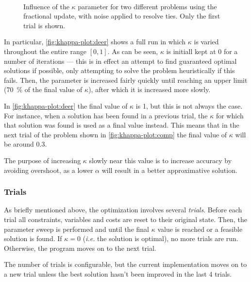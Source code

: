 \begin{figure}[p]
	\centering
	\\
	\caption{Influence of the \(\kappa\) parameter for two different problems using the fractional update, with noise applied to resolve ties. Only the first trial is shown.}
	\label{fig:khappa-plot}
\end{figure}

In particular, \cref{fig:khappa-plot:deer} shows a full run in which \(\kappa\) is varied throughout the entire range \([0,1]\).
As can be seen, \(\kappa\) is initiall kept at 0 for a number of iterations --- this is in effect an attempt to find guaranteed optimal solutions if possible, only attempting to solve the problem heuristically if this fails.
Then, the parameter is increased fairly quickly until reaching an upper limit (\SI{70}{\percent} of the final value of \(\kappa\)), after which it is increased more slowly.

In \cref{fig:khappa-plot:deer} the final value of \(\kappa\) is 1, but this is not always the case.
For instance, when a solution has been found in a previous trial, the \(\kappa\) for which that solution was found is used as a final value instead.
This means that in the next trial of the problem shown in \cref{fig:khappa-plot:comp} the final value of \(\kappa\) will be around \num{0.3}.

The purpose of increasing \(\kappa\) slowly near this value is to increase accuracy by avoiding overshoot, as a lower \(\alpha\) will result in a better approximative solution.


\subsubsection{Trials}
As briefly mentioned above, the optimization involves several \emph{trials}.
Before each trial all constraints, variables and costs are reset to their original state.
Then, the parameter sweep is performed and until the final \(\kappa\) value is reached or a feasible solution is found.
If \(\kappa=0\) (\emph{i.e.} the solution is optimal), no more trials are run.
Otherwise, the program moves on to the next trial.

The number of trials is configurable, but the current implementation moves on to a new trial unless the best solution hasn't been improved in the last 4 trials.
